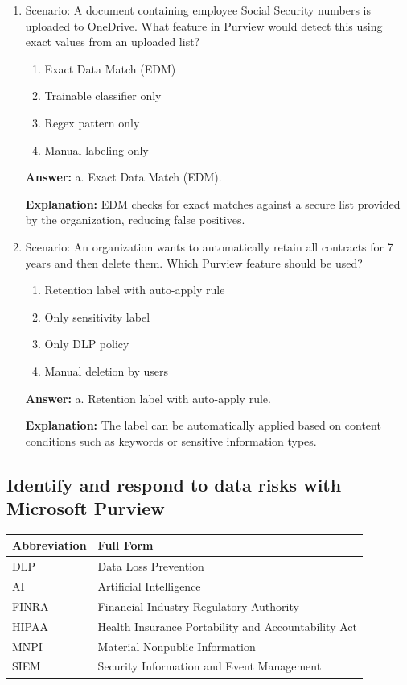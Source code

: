 \documentclass[10pt]{article}
\begin{document}
\begin{enumerate}[leftmargin=*]
\item Scenario: A document containing employee Social Security numbers is uploaded to OneDrive. What feature in Purview would detect this using exact values from an uploaded list?
\begin{enumerate}[label=\alph*., leftmargin=1.5em]
\item Exact Data Match (EDM)
\item Trainable classifier only
\item Regex pattern only
\item Manual labeling only
\end{enumerate}
\textbf{Answer:} a. Exact Data Match (EDM).

\textbf{Explanation:} EDM checks for exact matches against a secure list provided by the organization, reducing false positives.

\item Scenario: An organization wants to automatically retain all contracts for 7 years and then delete them. Which Purview feature should be used?
\begin{enumerate}[label=\alph*., leftmargin=1.5em]
\item Retention label with auto-apply rule
\item Only sensitivity label
\item Only DLP policy
\item Manual deletion by users
\end{enumerate}
\textbf{Answer:} a. Retention label with auto-apply rule.

\textbf{Explanation:} The label can be automatically applied based on content conditions such as keywords or sensitive information types.

\end{enumerate}
\clearpage

\subsection{Identify and respond to data risks with Microsoft Purview}

\begin{center}
\begin{tabular}{>{\raggedright\arraybackslash}p{} >{\raggedright\arraybackslash}p{}}
\toprule
\textbf{Abbreviation} & \textbf{Full Form} \\
\midrule
DLP & Data Loss Prevention \\
AI & Artificial Intelligence \\
FINRA & Financial Industry Regulatory Authority \\
HIPAA & Health Insurance Portability and Accountability Act \\
MNPI & Material Nonpublic Information \\
SIEM & Security Information and Event Management \\
\end{tabular}
\end{center}
\end{document}

